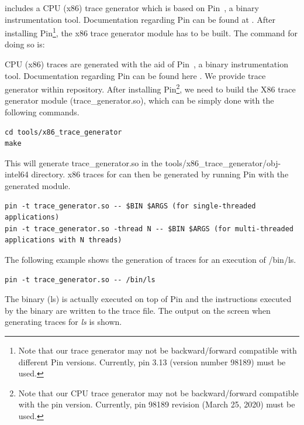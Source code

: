 \SIM includes a CPU (x86) trace generator which is based on Pin~\cite{pin}, a
binary instrumentation tool. Documentation regarding Pin can be found at
. 
After installing Pin\footnote{Note that our
trace generator may not be backward/forward compatible with different Pin
versions. Currently, pin 3.13 (version number 98189)  must be used.}, the x86
trace generator module has to be built. The command for doing so is:


\ignore
		{
		CPU (x86) traces are generated with the aid of Pin~\cite{pin}, a
		binary instrumentation tool.  Documentation regarding Pin can be found 
		here . 
		We provide \cpu trace generator within \SIM repository. After installing
		Pin\footnote{Note that our CPU trace generator may not be
		  backward/forward compatible with the pin version. Currently, pin
		  98189 revision (March 25, 2020) must be used.}, we need to build the
		X86 trace generator module (trace\_generator.so), which can be simply
		done with the following commands.
		}



\begin{Verbatim}
cd tools/x86_trace_generator
make
\end{Verbatim}

\noindent This will generate trace\_generator.so in the
tools/x86\_trace\_generator/obj-intel64 directory. x86
traces for \SIM can then be generated by running Pin with the generated module.


\begin{Verbatim}
pin -t trace_generator.so -- $BIN $ARGS (for single-threaded applications)
pin -t trace_generator.so -thread N -- $BIN $ARGS (for multi-threaded applications with N threads)
\end{Verbatim}


The following example shows the generation of traces for an execution of /bin/ls. 

\begin{Verbatim}
pin -t trace_generator.so -- /bin/ls
\end{Verbatim}


\noindent The binary (ls) is actually executed on top of Pin and the
instructions executed by the binary are written to the trace file. The output
on the screen when generating traces for \textit{ls} is shown.


